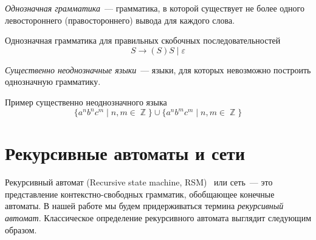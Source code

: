 \begin{definition}
    \emph{Однозначная грамматика}~--- грамматика, в которой существует не более одного левостороннего (правостороннего) вывода для каждого слова.
\end{definition}

\begin{example}
    Однозначная грамматика для правильных скобочных последовательностей
    \[
        S \to (S)S \mid \varepsilon
    \]
\end{example}

\begin{definition}
    \emph{Существенно неоднозначные языки}~--- языки, для которых невозможно построить однозначную грамматику.
\end{definition}

\begin{example}
    Пример существенно неоднозначного языка
    \[\{a^n b^n c^m \mid n, m \in \BbbZ\} \cup \{a^n b^m c^m \mid n,m \in \BbbZ\}\]
\end{example}

\section{Рекурсивные автоматы и сети}

Рекурсивный автомат (Recursive state machine, RSM)~ или сеть~--- это представление контекстно-свободных грамматик, обобщающее конечные автоматы.
В нашей работе мы будем придерживаться термина \emph{рекурсивный автомат}.
Классическое определение рекурсивного автомата выглядит следующим образом.

